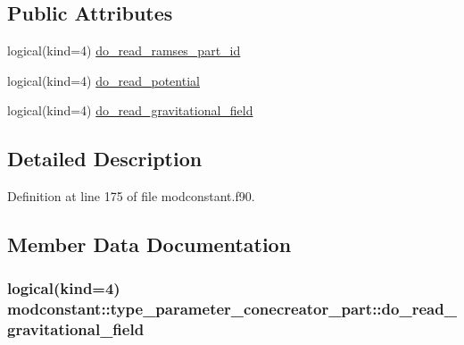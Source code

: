 \subsection*{Public Attributes}
\begin{DoxyCompactItemize}
\item 
logical(kind=4) \hyperlink{structmodconstant_1_1type__parameter__conecreator__part_a767cd774e985d3ce50b3131eb7ffa50b}{do\+\_\+read\+\_\+ramses\+\_\+part\+\_\+id}
\item 
logical(kind=4) \hyperlink{structmodconstant_1_1type__parameter__conecreator__part_ad8db85990febd9c00c5a5a6a2f1d0fd7}{do\+\_\+read\+\_\+potential}
\item 
logical(kind=4) \hyperlink{structmodconstant_1_1type__parameter__conecreator__part_ac4a1cdc3acedd360fdb769ce7975ba6c}{do\+\_\+read\+\_\+gravitational\+\_\+field}
\end{DoxyCompactItemize}


\subsection{Detailed Description}


Definition at line 175 of file modconstant.\+f90.



\subsection{Member Data Documentation}
\subsubsection[{\texorpdfstring{do\+\_\+read\+\_\+gravitational\+\_\+field}{do_read_gravitational_field}}]{\setlength{\rightskip}{0pt plus 5cm}logical(kind=4) modconstant\+::type\+\_\+parameter\+\_\+conecreator\+\_\+part\+::do\+\_\+read\+\_\+gravitational\+\_\+field}\hypertarget{structmodconstant_1_1type__parameter__conecreator__part_ac4a1cdc3acedd360fdb769ce7975ba6c}{}\label{structmodconstant_1_1type__parameter__conecreator__part_ac4a1cdc3acedd360fdb769ce7975ba6c}


